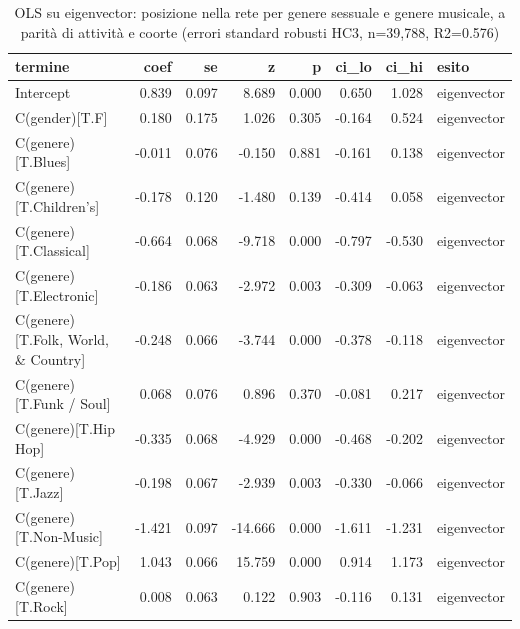 \begin{table}
\centering
\caption{OLS su eigenvector: posizione nella rete per genere sessuale e genere musicale, a parità di attività e coorte (errori standard robusti HC3, n=39,788, R2=0.576)}
\label{tab:t3_regressione_eigenvector}
\begin{tabular}{lrrrrrrl}
\toprule
                                           termine &   coef &    se &       z &     p &  ci\_lo &  ci\_hi &       esito \\
\midrule
                                         Intercept &  0.839 & 0.097 &   8.689 & 0.000 &  0.650 &  1.028 & eigenvector \\
                                    C(gender)[T.F] &  0.180 & 0.175 &   1.026 & 0.305 & -0.164 &  0.524 & eigenvector \\
                                C(genere)[T.Blues] & -0.011 & 0.076 &  -0.150 & 0.881 & -0.161 &  0.138 & eigenvector \\
                           C(genere)[T.Children's] & -0.178 & 0.120 &  -1.480 & 0.139 & -0.414 &  0.058 & eigenvector \\
                            C(genere)[T.Classical] & -0.664 & 0.068 &  -9.718 & 0.000 & -0.797 & -0.530 & eigenvector \\
                           C(genere)[T.Electronic] & -0.186 & 0.063 &  -2.972 & 0.003 & -0.309 & -0.063 & eigenvector \\
               C(genere)[T.Folk, World, \& Country] & -0.248 & 0.066 &  -3.744 & 0.000 & -0.378 & -0.118 & eigenvector \\
                          C(genere)[T.Funk / Soul] &  0.068 & 0.076 &   0.896 & 0.370 & -0.081 &  0.217 & eigenvector \\
                              C(genere)[T.Hip Hop] & -0.335 & 0.068 &  -4.929 & 0.000 & -0.468 & -0.202 & eigenvector \\
                                 C(genere)[T.Jazz] & -0.198 & 0.067 &  -2.939 & 0.003 & -0.330 & -0.066 & eigenvector \\
                            C(genere)[T.Non-Music] & -1.421 & 0.097 & -14.666 & 0.000 & -1.611 & -1.231 & eigenvector \\
                                  C(genere)[T.Pop] &  1.043 & 0.066 &  15.759 & 0.000 &  0.914 &  1.173 & eigenvector \\
                                 C(genere)[T.Rock] &  0.008 & 0.063 &   0.122 & 0.903 & -0.116 &  0.131 & eigenvector \\

\end{tabular}
\end{table}
